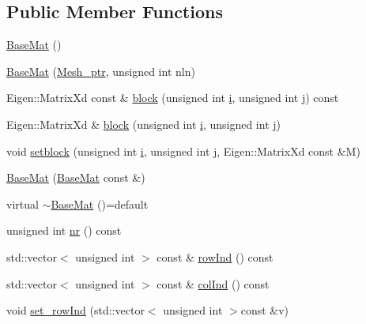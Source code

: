 \subsection*{Public Member Functions}
\begin{DoxyCompactItemize}
\item 
\hyperlink{classTspeed_1_1BaseMat_a0bc33a9288577b32639974d28e686026}{Base\-Mat} ()
\item 
\hyperlink{classTspeed_1_1BaseMat_a23de2c55f78003dbadae51a3c495b9e9}{Base\-Mat} (\hyperlink{namespaceTspeed_a7367a01365c4cc2c1a09305b3effc4e8}{Mesh\-\_\-ptr}, unsigned int nln)
\item 
Eigen\-::\-Matrix\-Xd const \& \hyperlink{classTspeed_1_1BaseMat_a9abd329c5642cb0733dc9bae2bc27c40}{block} (unsigned int \hyperlink{vtk__vector__out_8m_a6f6ccfcf58b31cb6412107d9d5281426}{i}, unsigned int \hyperlink{vtk__mesh__out_8m_af1af736f0a1475ea44566768103395cb}{j}) const 
\item 
Eigen\-::\-Matrix\-Xd \& \hyperlink{classTspeed_1_1BaseMat_aee18568676b6ec413ef58292278b88b1}{block} (unsigned int \hyperlink{vtk__vector__out_8m_a6f6ccfcf58b31cb6412107d9d5281426}{i}, unsigned int \hyperlink{vtk__mesh__out_8m_af1af736f0a1475ea44566768103395cb}{j})
\item 
void \hyperlink{classTspeed_1_1BaseMat_af8995143af50b0c6296ba6565238722a}{setblock} (unsigned int \hyperlink{vtk__vector__out_8m_a6f6ccfcf58b31cb6412107d9d5281426}{i}, unsigned int \hyperlink{vtk__mesh__out_8m_af1af736f0a1475ea44566768103395cb}{j}, Eigen\-::\-Matrix\-Xd const \&M)
\item 
\hyperlink{classTspeed_1_1BaseMat_aac366647d4c8c12ffca8ab1c8fb8881a}{Base\-Mat} (\hyperlink{classTspeed_1_1BaseMat}{Base\-Mat} const \&)
\item 
virtual \hyperlink{classTspeed_1_1BaseMat_a0aa68786e0a52c9f1fe6838813a299ce}{$\sim$\-Base\-Mat} ()=default
\item 
unsigned int \hyperlink{classTspeed_1_1BaseMat_a484dafa1e629d9774c8a402945a2c132}{nr} () const 
\item 
std\-::vector$<$ unsigned int $>$ const \& \hyperlink{classTspeed_1_1BaseMat_a4340f54ae8855520777976d76a054d25}{row\-Ind} () const 
\item 
std\-::vector$<$ unsigned int $>$ const \& \hyperlink{classTspeed_1_1BaseMat_a49b084a9e5a94fd0b188c7b2fd8eb1b6}{col\-Ind} () const 
\item 
void \hyperlink{classTspeed_1_1BaseMat_ae38cb2311d29d37b11692af1bd7cbb7d}{set\-\_\-row\-Ind} (std\-::vector$<$ unsigned int $>$const \&v)

\end{DoxyCompactItemize}
